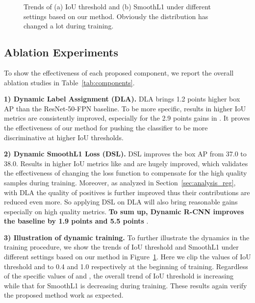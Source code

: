 \documentclass[runningheads]{llncs}
\begin{document}
\begin{figure}[!t]
    \centering
    \caption{Trends of (a) IoU threshold and (b) SmoothL1  under different settings based on our method. Obviously the distribution has changed a lot during training.}
    \label{fig:dynamic_trend}
\end{figure}


\subsection{Ablation Experiments}
To show the effectiveness of each proposed component, we report the overall ablation studies in Table~\ref{tab:components}.

\noindent
\textbf{1) Dynamic Label Assignment (DLA).}
DLA brings 1.2 points higher box AP than the ResNet-50-FPN baseline. To be more specific, results in higher IoU metrics are consistently improved, especially for the 2.9 points gains in . It proves the effectiveness of our method for pushing the classifier to be more discriminative at higher IoU thresholds.

\noindent
\textbf{2) Dynamic SmoothL1 Loss (DSL).}
DSL improves the box AP from 37.0 to 38.0. Results in higher IoU metrics like  and  are hugely improved, which validates the effectiveness of changing the loss function to compensate for the high quality samples during training. Moreover, as analyzed in Section~\ref{sec:analysis_reg}, with DLA the quality of positives is further improved thus their contributions are reduced even more. So applying DSL on DLA will also bring reasonable gains especially on high quality metrics. \textbf{To sum up, Dynamic R-CNN improves the baseline by 1.9 points  and 5.5 points }.

\noindent
\textbf{3) Illustration of dynamic training.}
To further illustrate the dynamics in the training procedure, we show the trends of IoU threshold and SmoothL1  under different settings based on our method in Figure~\ref{fig:dynamic_trend}. Here we clip the values of IoU threshold and  to 0.4 and 1.0 respectively at the beginning of training.
Regardless of the specific values of  and , the overall trend of IoU threshold is increasing while that for SmoothL1  is decreasing during training. These results again verify the proposed method work as expected.
\end{document}
